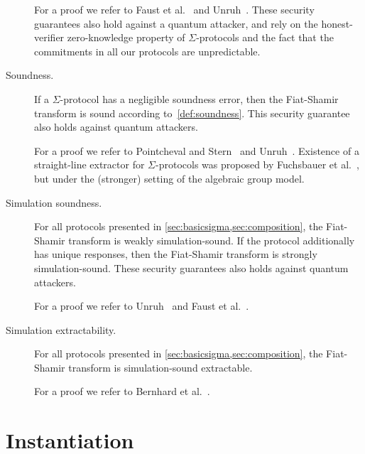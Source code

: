 \documentclass[runningheads]{llncs}
\begin{document}
\begin{description}
    For a proof we refer to Faust et al.~\cite{INDOCRYPT:FKMV12} and Unruh~\cite{AC:Unruh17}. These security guarantees also hold against a quantum attacker, and rely on the honest-verifier zero-knowledge property of $\Sigma$-protocols and the fact that the commitments in all our protocols are unpredictable.
  \item[Soundness.]
    If a $\Sigma$-protocol has a negligible soundness error, then the Fiat-Shamir transform is sound according to~\cref{def:soundness}.
    This security guarantee also holds against quantum attackers.

    For a proof we refer to Pointcheval and Stern~\cite{JC:PoiSte00} and Unruh~\cite{AC:Unruh17}.
    {Existence of a straight-line extractor for $\Sigma$-protocols was proposed by Fuchsbauer et al.~\cite{C:FucKilLos18}, but under the (stronger) setting of the algebraic group model.}

  \item[Simulation soundness.]
    For all protocols presented in \cref{sec:basicsigma,sec:composition}, the Fiat-Shamir transform is  weakly simulation-sound.
    If the protocol additionally has unique responses, then the Fiat-Shamir transform is  strongly simulation-sound.
    These security guarantees also holds against quantum attackers.

    For a proof we refer to Unruh~\cite{AC:Unruh17} and Faust et al.~\cite{INDOCRYPT:FKMV12}.
  \item[Simulation extractability.]
    For all protocols presented in \cref{sec:basicsigma,sec:composition}, the Fiat-Shamir transform is  simulation-sound extractable.

    For a proof we refer to Bernhard et al.~\cite{AC:BerPerWar12}.
\end{description}

\section{Instantiation}
\label{sec:instantiation}
\end{document}
